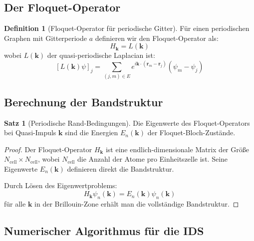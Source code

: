 \documentclass[a4paper,12pt]{article}
\theoremstyle{definition}
\newtheorem{definition}{Definition}[section]
\newtheorem{satz}{Satz}[section]
\begin{document}
\subsection{Der Floquet-Operator}

\begin{definition}[Floquet-Operator für periodische Gitter]
	Für einen periodischen Graphen mit Gitterperiode $a$ definieren wir den Floquet-Operator als:
	\[
	H_{\mathbf{k}} = L(\mathbf{k})
	\]
	wobei $L(\mathbf{k})$ der quasi-periodische Laplacian ist:
	\[
	[L(\mathbf{k}) \psi]_j = \sum_{(j,m) \in E} e^{i \mathbf{k} \cdot (\mathbf{r}_m - \mathbf{r}_j)} (\psi_m - \psi_j)
	\]
\end{definition}

\subsection{Berechnung der Bandstruktur}

\begin{satz}[Periodische Rand-Bedingungen]
	Die Eigenwerte des Floquet-Operators bei Quasi-Impuls $\mathbf{k}$ sind die Energien $E_n(\mathbf{k})$ der Floquet-Bloch-Zustände.
\end{satz}

\begin{proof}
	Der Floquet-Operator $H_{\mathbf{k}}$ ist eine endlich-dimensionale Matrix der Größe $N_{\text{cell}} \times N_{\text{cell}}$, wobei $N_{\text{cell}}$ die Anzahl der Atome pro Einheitszelle ist. Seine Eigenwerte $E_n(\mathbf{k})$ definieren direkt die Bandstruktur.
	
	Durch Lösen des Eigenwertproblems:
	\[
	H_{\mathbf{k}} \psi_n(\mathbf{k}) = E_n(\mathbf{k}) \psi_n(\mathbf{k})
	\]
	für alle $\mathbf{k}$ in der Brillouin-Zone erhält man die vollständige Bandstruktur.
\end{proof}

\subsection{Numerischer Algorithmus für die IDS}
\end{document}
